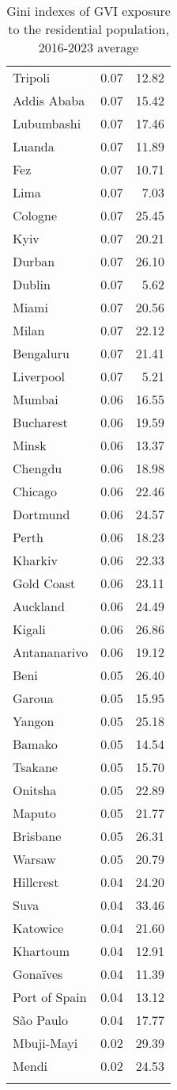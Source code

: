 \begin{longtable}{lrr}
  Tripoli & 0.07 & 12.82 \\ 
  Addis Ababa & 0.07 & 15.42 \\ 
  Lubumbashi & 0.07 & 17.46 \\ 
  Luanda & 0.07 & 11.89 \\ 
  Fez & 0.07 & 10.71 \\ 
  Lima & 0.07 & 7.03 \\ 
  Cologne & 0.07 & 25.45 \\ 
  Kyiv & 0.07 & 20.21 \\ 
  Durban & 0.07 & 26.10 \\ 
  Dublin & 0.07 & 5.62 \\ 
  Miami & 0.07 & 20.56 \\ 
  Milan & 0.07 & 22.12 \\ 
  Bengaluru & 0.07 & 21.41 \\ 
  Liverpool & 0.07 & 5.21 \\ 
  Mumbai & 0.06 & 16.55 \\ 
  Bucharest & 0.06 & 19.59 \\ 
  Minsk & 0.06 & 13.37 \\ 
  Chengdu & 0.06 & 18.98 \\ 
  Chicago & 0.06 & 22.46 \\ 
  Dortmund & 0.06 & 24.57 \\ 
  Perth & 0.06 & 18.23 \\ 
  Kharkiv & 0.06 & 22.33 \\ 
  Gold Coast & 0.06 & 23.11 \\ 
  Auckland & 0.06 & 24.49 \\ 
  Kigali & 0.06 & 26.86 \\ 
  Antananarivo & 0.06 & 19.12 \\ 
  Beni & 0.05 & 26.40 \\ 
  Garoua & 0.05 & 15.95 \\ 
  Yangon & 0.05 & 25.18 \\ 
  Bamako & 0.05 & 14.54 \\ 
  Tsakane & 0.05 & 15.70 \\ 
  Onitsha & 0.05 & 22.89 \\ 
  Maputo & 0.05 & 21.77 \\ 
  Brisbane & 0.05 & 26.31 \\ 
  Warsaw & 0.05 & 20.79 \\ 
  Hillcrest & 0.04 & 24.20 \\ 
  Suva & 0.04 & 33.46 \\ 
  Katowice & 0.04 & 21.60 \\ 
  Khartoum & 0.04 & 12.91 \\ 
  Gonaïves & 0.04 & 11.39 \\ 
  Port of Spain & 0.04 & 13.12 \\ 
  São Paulo & 0.04 & 17.77 \\ 
  Mbuji-Mayi & 0.02 & 29.39 \\ 
  Mendi & 0.02 & 24.53 \\ 
   \hline
\hline
\caption{Gini indexes of GVI exposure to the residential population, 2016-2023 average} 
\label{tab:gini}
\end{longtable}
